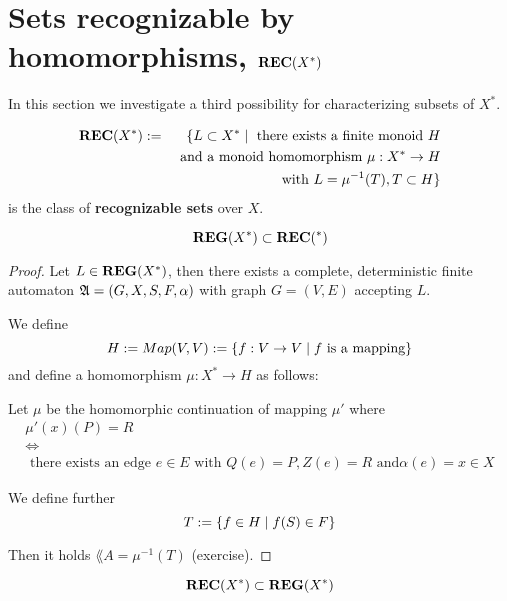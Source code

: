 \section{Sets recognizable by homomorphisms, $\mbox{{\bf REC}}(X^*)$}

In this section we investigate a third possibility for characterizing subsets of
$X^*$.

\begin{definition}
\begin{eqnarray*}
 \mbox{{\bf REC}}(X^*) & := & \{ L \subset X^* \mid \mbox{ there exists a
finite monoid } H \\
& & \mbox{ and a monoid homomorphism }\mu : X^* \to H \\
& & \mbox{ with } L = \mu^{-1}(T), T \subset H \}
\end{eqnarray*}
is the class of {\bf recognizable sets} over $X$.
\end{definition}

\begin{lemma}
\[ \mbox{{\bf REG}}(X^*) \subset \mbox{{\bf REC}}(^*) \]
\end{lemma}

\begin{proof}
Let $L \in \mbox{{\bf REG}}(X^*)$, then there exists a complete, deterministic finite
automaton $\mbox{$\mathfrak{A}$} = (G, X, S, F, \alpha)$ with graph $G = (V, E)$ accepting $L$.

We define 
\[ H := Map(V,V) := \mbox{$\{f : V \to V \mid f \mbox{ is a mapping}\}$} \]
and define a homomorphism $\mu : X^* \to H$ as follows:

Let $\mu$ be the homomorphic continuation of mapping $\mu'$ where
\begin{eqnarray*}
& \mu'(x)(P) = R & \\
& \Leftrightarrow & \\
& \mbox{ there exists an edge }e \in E\mbox{ with }Q(e) = P, Z(e) = R\mbox{ and
}\alpha(e) = x \in X &
\end{eqnarray*}

We define further \[ T := \mbox{$\{f \in H \mid f(S) \in F\}$} \]

Then it holds $\lang{A} = \mu^{-1}(T)$ (exercise).
\end{proof}

\bigskip
\begin{lemma}
\[ \mbox{{\bf REC}}(X^*) \subset \mbox{{\bf REG}}(X^*) \]
\end{lemma}

